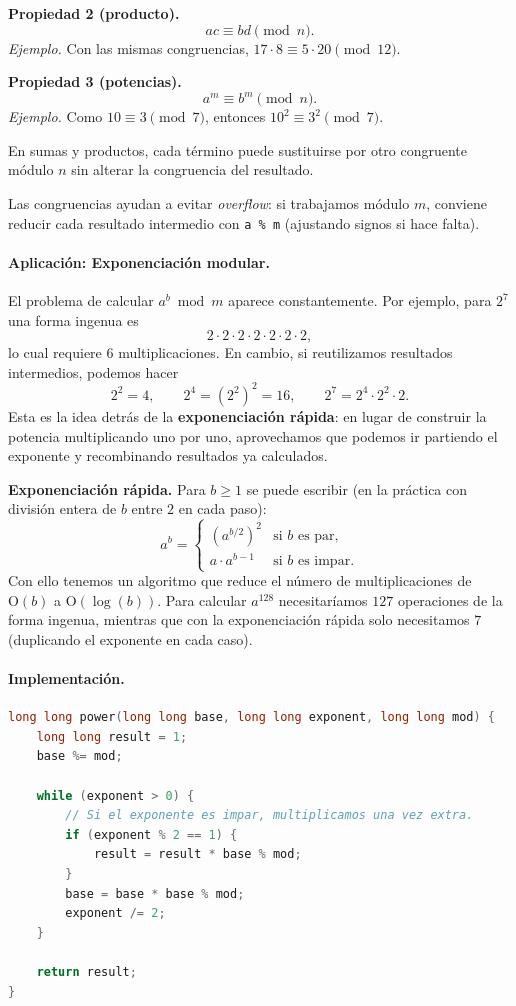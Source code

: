 \textbf{Propiedad 2 (producto).}
\[
ac \equiv bd \pmod{n}.
\]
\textit{Ejemplo.} Con las mismas congruencias, $17 \cdot 8 \equiv 5 \cdot 20 \pmod{12}$.

\textbf{Propiedad 3 (potencias).}
\[
a^m \equiv b^m \pmod{n}.
\]
\textit{Ejemplo.} Como $10 \equiv 3 \pmod{7}$, entonces $10^2 \equiv 3^2 \pmod{7}$.

En sumas y productos, cada término puede sustituirse por otro congruente módulo $n$ sin alterar la congruencia del resultado.

Las congruencias ayudan a evitar \textit{overflow}: si trabajamos módulo $m$, conviene reducir cada resultado intermedio con \texttt{a \% m} (ajustando signos si hace falta).
\label{sec:expbin}
\paragraph{Aplicación: Exponenciación modular.} El problema de calcular $a^b \bmod m$ aparece constantemente. Por ejemplo, para $2^7$ una forma ingenua es
\[
2 \cdot 2 \cdot 2 \cdot 2 \cdot 2 \cdot 2 \cdot 2,
\]
lo cual requiere $6$ multiplicaciones. En cambio, si reutilizamos resultados intermedios, podemos hacer
\[
2^2 = 4, \qquad 2^4 = (2^2)^2 = 16, \qquad 2^7 = 2^4 \cdot 2^2 \cdot 2.
\]
Esta es la idea detrás de la \textbf{exponenciación rápida}: en lugar de construir la potencia multiplicando uno por uno, aprovechamos que podemos ir partiendo el exponente y recombinando resultados ya calculados.

\textbf{Exponenciación rápida.} Para $b \ge 1$ se puede escribir (en la práctica con división entera de $b$ entre $2$ en cada paso):
\[
a^b = \begin{cases} (a^{b/2})^2 & \text{si } b \text{ es par}, \\ a \cdot a^{b-1} & \text{si } b \text{ es impar}. \end{cases}
\]
Con ello tenemos un algoritmo que reduce el número de multiplicaciones de $\text{O}(b)$ a $\text{O}(\log(b))$. Para calcular $a^{128}$ necesitaríamos $127$ operaciones de la forma ingenua, mientras que con la exponenciación rápida solo necesitamos $7$ (duplicando el exponente en cada caso).

\paragraph{Implementación.}

\begin{lstlisting}[language=C++]
long long power(long long base, long long exponent, long long mod) {
    long long result = 1;
    base %= mod;

    while (exponent > 0) {
        // Si el exponente es impar, multiplicamos una vez extra.
        if (exponent % 2 == 1) {
            result = result * base % mod;
        }
        base = base * base % mod;
        exponent /= 2;
    }

    return result;
}
\end{lstlisting}

